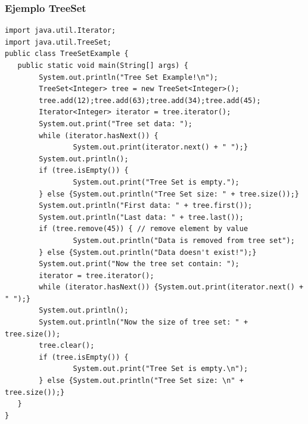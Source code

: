 \documentclass{beamer}
\begin{document}
\begin{frame}[fragile]
\frametitle{Ejemplo TreeSet}
\begin{tiny}
\begin{verbatim}
import java.util.Iterator;
import java.util.TreeSet;
public class TreeSetExample {
   public static void main(String[] args) {
        System.out.println("Tree Set Example!\n");
        TreeSet<Integer> tree = new TreeSet<Integer>();
        tree.add(12);tree.add(63);tree.add(34);tree.add(45);
        Iterator<Integer> iterator = tree.iterator();
        System.out.print("Tree set data: ");
        while (iterator.hasNext()) {
                System.out.print(iterator.next() + " ");}
        System.out.println();
        if (tree.isEmpty()) {
                System.out.print("Tree Set is empty.");
        } else {System.out.println("Tree Set size: " + tree.size());}
        System.out.println("First data: " + tree.first());
        System.out.println("Last data: " + tree.last());
        if (tree.remove(45)) { // remove element by value
                System.out.println("Data is removed from tree set");
        } else {System.out.println("Data doesn't exist!");}
        System.out.print("Now the tree set contain: ");
        iterator = tree.iterator();
        while (iterator.hasNext()) {System.out.print(iterator.next() + " ");}
        System.out.println();
        System.out.println("Now the size of tree set: " + tree.size());
        tree.clear();
        if (tree.isEmpty()) {
                System.out.print("Tree Set is empty.\n");
        } else {System.out.println("Tree Set size: \n" + tree.size());}
   }
}
\end{verbatim}
\end{tiny}
\end{frame}
\end{document}
